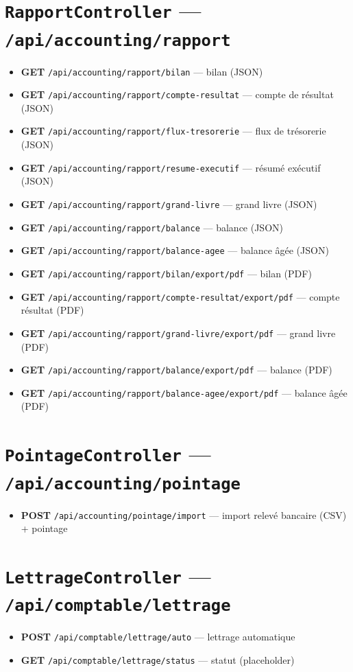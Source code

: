 \section{\texttt{RapportController} --- \texttt{/api/accounting/rapport}}
\begin{itemize}
  \item \textbf{GET} \texttt{/api/accounting/rapport/bilan} --- bilan (JSON)
  \item \textbf{GET} \texttt{/api/accounting/rapport/compte-resultat} --- compte de résultat (JSON)
  \item \textbf{GET} \texttt{/api/accounting/rapport/flux-tresorerie} --- flux de trésorerie (JSON)
  \item \textbf{GET} \texttt{/api/accounting/rapport/resume-executif} --- résumé exécutif (JSON)
  \item \textbf{GET} \texttt{/api/accounting/rapport/grand-livre} --- grand livre (JSON)
  \item \textbf{GET} \texttt{/api/accounting/rapport/balance} --- balance (JSON)
  \item \textbf{GET} \texttt{/api/accounting/rapport/balance-agee} --- balance âgée (JSON)
  \item \textbf{GET} \texttt{/api/accounting/rapport/bilan/export/pdf} --- bilan (PDF)
  \item \textbf{GET} \texttt{/api/accounting/rapport/compte-resultat/export/pdf} --- compte résultat (PDF)
  \item \textbf{GET} \texttt{/api/accounting/rapport/grand-livre/export/pdf} --- grand livre (PDF)
  \item \textbf{GET} \texttt{/api/accounting/rapport/balance/export/pdf} --- balance (PDF)
  \item \textbf{GET} \texttt{/api/accounting/rapport/balance-agee/export/pdf} --- balance âgée (PDF)
\end{itemize}

\section{\texttt{PointageController} --- \texttt{/api/accounting/pointage}}
\begin{itemize}
  \item \textbf{POST} \texttt{/api/accounting/pointage/import} --- import relevé bancaire (CSV) + pointage
\end{itemize}

\section{\texttt{LettrageController} --- \texttt{/api/comptable/lettrage}}
\begin{itemize}
  \item \textbf{POST} \texttt{/api/comptable/lettrage/auto} --- lettrage automatique
  \item \textbf{GET} \texttt{/api/comptable/lettrage/status} --- statut (placeholder)
\end{itemize}

